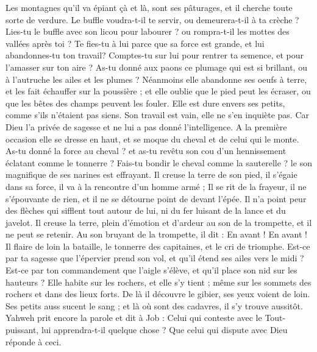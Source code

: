 \begin{multicols}{2}
{Les montagnes qu'il va épiant çà et là, sont ses pâturages, et il cherche toute sorte de verdure. 
Le buffle voudra-t-il te servir, ou demeurera-t-il à ta crèche ? 
Lies-tu le buffle avec son licou pour labourer ? ou rompra-t-il les mottes des vallées après toi ? 
Te fies-tu à lui parce que sa force est grande, et lui abandonnes-tu ton travail? 
Comptes-tu sur lui pour rentrer ta semence, et pour l'amasser sur ton aire ? 
As-tu donné aux paons ce plumage qui est si brillant, ou à l'autruche les ailes et les plumes ? 
Néanmoins elle abandonne ses oeufs à terre, et les fait échauffer sur la poussière ;
et elle oublie que le pied peut les écraser, ou que les bêtes des champs peuvent les fouler. 
Elle est dure envers ses petits, comme s’ils n’étaient pas siens. Son travail est vain, elle ne s’en inquiète pas.
Car Dieu l'a privée de sagesse et ne lui a pas donné l'intelligence.
A la première occasion elle se dresse en haut, et se moque du cheval et de celui qui le monte. 
As-tu donné la force au cheval ? et as-tu revêtu son cou d'un hennissement éclatant comme le tonnerre ? 
Fais-tu bondir le cheval comme la sauterelle ? le son magnifique de ses narines est effrayant.
Il creuse la terre de son pied, il s'égaie dans sa force, il va à la rencontre d'un homme armé ;
Il se rit de la frayeur, il ne s'épouvante de rien, et il ne se détourne point de devant l'épée.
Il n'a point peur des flèches qui sifflent tout autour de lui, ni du fer luisant de la lance et du javelot. 
Il creuse la terre, plein d'émotion et d'ardeur au son de la trompette, et il ne peut se retenir. 
Au son bruyant de la trompette, il dit : En avant ! En avant ! Il flaire de loin la bataille, le tonnerre des capitaines, et le cri de triomphe.
Est-ce par ta sagesse que l'épervier prend son vol, et qu'il étend ses ailes vers le midi ?
Est-ce par ton commandement que l'aigle s'élève, et qu'il place son nid sur les hauteurs ?
Elle habite sur les rochers, et elle s'y tient ; même sur les sommets des rochers et dans des lieux forts. 
De là il découvre le gibier, ses yeux voient de loin.
Ses petits auss sucent le sang ; et là où sont des cadavres, il s'y trouve aussitôt.
Yahweh prit encore la parole et dit à Job :
Celui qui conteste avec le Tout-puissant, lui apprendra-t-il quelque chose ? Que celui qui dispute avec Dieu réponde à ceci.
}
\end{multicols}
